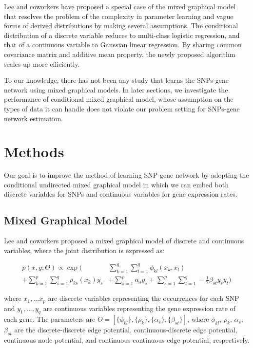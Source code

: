 \documentclass{article}
\begin{document}
Lee and coworkers \cite{lee2013structure} have proposed a special case of the mixed graphical model that resolves the problem of the complexity in parameter learning and vague forms of derived distributions by making several assumptions.
The conditional distribution of a discrete variable reduces to multi-class logistic regression, and that of a continuous variable to Gaussian linear regression.
By sharing common covariance matrix and additive mean property, the newly proposed algorithm scales up more efficiently.


To our knowledge, there has not been any study that learns the SNPs-gene network using mixed graphical models. In later sections, we investigate the performance of conditional mixed graphical model, whose assumption on the types of data it can handle does not violate our problem setting for SNPs-gene network estimation. 


\section{Methods}
\label{Methods}
Our goal is to improve the method of learning SNP-gene network by adopting the conditional undirected mixed graphical model in which we can embed both discrete variables for SNPs and continuous variables for gene expression rates.

\subsection{Mixed Graphical Model}
Lee and coworkers \cite{lee2013structure} proposed a mixed graphical model of discrete and continuous variables, where the joint distribution is expressed as:

\begin{align}
p(x, y ; \Theta) \propto \exp \Big( &\sum_{k=1}^{q} \sum_{l=1}^{q} \phi_{kl} (x_k, x_l) \nonumber \\
+ \sum_{k=1}^{p} \sum_{s=1}^{q} \rho_{ks}(x_k) y_s  &+ \sum_{s=1}^{p} \alpha_s y_s + \sum_{s=1}^{p} \sum_{t=1}^{q} -\frac{1}{2} \beta_{st} y_s y_t \Big) \label{eq:joint}
\end{align} 

where $x_1, ... x_p$ are discrete variables representing the occurrences for each SNP and $y_1, ..., y_q$ are continuous variables representing the gene expression rate of each gene. 
The parameters are $\Theta = [\{\phi_{kl}\}, \{\rho_{k}\}, \{\alpha_{s}\}, \{\beta_{st}\}]$, where $\phi_{kl}$, $\rho_{k}$, $\alpha_{s}$, $\beta_{st}$ are the discrete-discrete edge potential, continuous-discrete edge potential, continuous node potential, and continuous-continuous edge potential, respectively.
\end{document}
